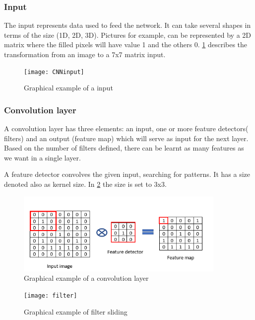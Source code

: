 \subsubsection{Input}
\par
The input represents data used to feed the network. It can take several shapes in terms of the size (1D, 2D, 3D). Pictures for example, can be represented by a 2D matrix where the filled pixels will have value 1 and the others 0.
\cref{fig:input} describes the transformation from an image to a 7x7 matrix input.

\begin{figure}[ht]
    \centering
    \texttt{[image: CNNinput]}
    \caption{Graphical example of a input}
    \label{fig:input}
\end{figure}

\subsubsection{Convolution layer}
\label{sec:convolution layer}
\par
A convolution layer has three elements: an input, one or more feature detectors( filters) and an output (feature map) which will serve as input for the next layer. Based on the number of filters defined, there can be learnt as many features as we want in a single layer.\newline
\par
A feature detector convolves the given input, searching for patterns. It has a size denoted also as kernel size. In \cref{fig:convolution} the size is set to 3x3. 

\begin{figure}[ht]
    \centering
    \includegraphics[width=0.9\textwidth]{convolutionLayer}
    \caption{Graphical example of a convolution layer}
    \label{fig:convolution}
\end{figure}

\begin{figure}[ht]
    \centering
    \texttt{[image: filter]}
    \caption{Graphical example of filter sliding}
    \label{fig:filter}
\end{figure}

